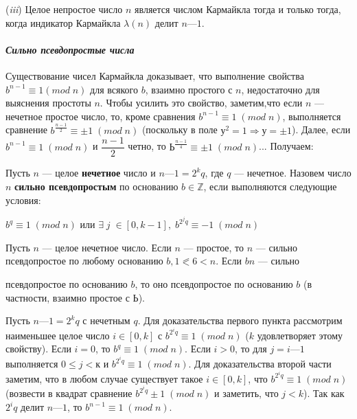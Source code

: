 \documentclass{mai_book}
\begin{document}
  	({\it iii}) Целое непростое число $n$ является числом Кармайкла тогда и  	только тогда, когда индикатор Кармайкла $\lambda(n)$ делит $n — 1$.
  	\paragraph{{\it Сильно псевдопростые числа}} 
  	\noindent
  	
  	Существование чисел Кармайкла доказывает, что выполнение свой­ства $b^{n-1} \equiv 1 (mod \;n)$ для всякого $b$, взаимно простого с $n$, недостаточно для выяснения простоты $n$. Чтобы усилить это свойство, заметим,что если $n$ — нечетное простое число, то, кроме сравнения $b^{n-1}\equiv1\;(mod\;n)$,	 выполняется сравнение $b^{\frac{n-1}{2}}\equiv\pm 1 \;(mod\;n)$ (поскольку в поле $у^2=1 \Rightarrow у = \pm 1$). Далее, если $b^{n-1}\equiv1\;(mod\;n)$ и $\dfrac{n-1}{2}$ четно, то $Ь^{\frac{n-1}{4}} \equiv \pm 1\;(mod\;n)$... Получаем:
  	
  	\begin{determ} 
  	\noindent

  	Пусть $n$ — целое {\bf нечетное} число и $n — 1 = 2^kq$, где $q$ — нечетное.	Назовем число $n$ {\bf сильно псевдопростым} по основанию $b \in \mathbb Z$, если	выполняются следующие условия:
  	
  	\begin{center}
  		$b^q\equiv1 \; (mod\;n)$ или $\exists\;j\;\in [0,k-1],\; b^{2^{j}q}\equiv-1\;(mod\;n)$
  	\end{center}
  	\end{determ}
  
  	\begin{predl} 
  	\noindent

  	Пусть $n$ — целое нечетное число. Если $n$ — простое, то $n$ — сильно псевдопростое по любому основанию $b, 1 \eqslantless6<n$. Если $bn$ — сильно 
  
  	\pagebreak 
  	
  	\noindent
  	псевдопростое по основанию $b$, то оно псевдопростое по основанию $b$ (в частности, взаимно простое с $Ь$).
	\end{predl}
  	
  	\begin{myproof} 
  	\noindent
  	
  	
  		Пусть $n — 1 = 2^kq$ с нечетным $q$. Для доказательства первого пункта рассмотрим наименьшее целое число $i \in [0, k]$ с $b^{2^{i}q} \equiv 1\;(mod\;n)$ ($k$ удовлетворяет этому свойству). Если $i = 0$, то $b^q \equiv 1\;(mod\;n)$. Если	$i > 0$, то для $j = i — 1$ выполняется $0 \leqslant j < к$ и $b^{2^{i}q} \equiv 1\;(mod\;n)$.	Для доказательства второй части заметим, что в любом случае существует такое $i \in [0, k]$, что $b^{2^{i}q} \equiv 1\;(mod\;n)$ (возвести в квадрат
  		сравнение $b^{2^{i}q} \pm 1\;(mod\;n)$ и заметить, что $j < k$). Так как $2^{i}q$ делит $n — 1$, то $b^{n-1} \equiv 1\;(mod \;n)$.

  		
  	\end{myproof}	
  	
\end{document}
